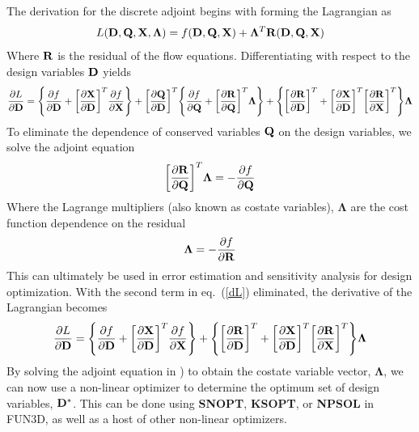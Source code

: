 The derivation for the discrete adjoint begins with forming the Lagrangian as
\begin{equation}
  L(\mathbf D,\mathbf Q,\mathbf X,\mathbf{\Lambda})=f(\mathbf D,\mathbf Q,\mathbf X)
  +\mathbf{\Lambda}^T\mathbf R(\mathbf D,\mathbf Q,\mathbf X)
\end{equation}
Where $\mathbf R$ is the residual of the flow equations.  Differentiating with respect
to the design variables $\mathbf D$ yields
\begin{equation}
  \frac{\partial L}{\partial \mathbf D} = 
  \Bigg\{\frac{\partial f}{\partial \mathbf D}+\bigg[\frac{\partial \mathbf X}{\partial \mathbf D}\bigg]^T \frac{\partial f}{\partial \mathbf X}\Bigg\} 
  + \bigg[\frac{\partial \mathbf Q}{\partial \mathbf D}\bigg]^T
  \Bigg\{\frac{\partial f}{\partial \mathbf Q}+\bigg[\frac{\partial \mathbf R}{\partial \mathbf Q}\bigg]^T \mathbf{\Lambda}\Bigg\}
  +\Bigg\{\bigg[\frac{\partial \mathbf R}{\partial \mathbf D}\bigg]^T
  +\bigg[\frac{\partial \mathbf X}{\partial \mathbf D}\bigg]^T\bigg[\frac{\partial \mathbf R}{\partial \mathbf X}\bigg]^T\Bigg\}\mathbf{\Lambda}
  \label{dL}
\end{equation}
To eliminate the dependence of conserved variables $\mathbf Q$ on the design
variables, we solve the adjoint equation
\begin{equation}
  \bigg[\frac{\partial \mathbf R}{\partial \mathbf Q}\bigg]^T\mathbf{\Lambda} = -\frac{\partial f}{\partial \mathbf Q}
  \label{adjoint-main}
\end{equation}
Where the Lagrange multipliers (also known as costate variables),
$\mathbf{\Lambda}$ are the cost function dependence on the residual
\begin{equation}
  \mathbf{\Lambda}=-\frac{\partial f}{\partial \mathbf R}
\end{equation}
This can ultimately be used in error estimation and sensitivity analysis for
design optimization.  With the second term in eq.~(\ref{dL}) eliminated, the
derivative of the Lagrangian becomes
\begin{equation}
  \frac{\partial L}{\partial \mathbf D}=
  \Bigg\{\frac{\partial f}{\partial \mathbf D}+\bigg[\frac{\partial \mathbf X}{\partial \mathbf D}\bigg]^T \frac{\partial f}{\partial \mathbf X}\Bigg\}
  +\Bigg\{\bigg[\frac{\partial \mathbf R}{\partial \mathbf D}\bigg]^T
  +\bigg[\frac{\partial \mathbf X}{\partial \mathbf D}\bigg]^T\bigg[\frac{\partial \mathbf R}{\partial \mathbf X}\bigg]^T\Bigg\}\mathbf{\Lambda}
  \label{obj-function}
\end{equation}
By solving the adjoint equation in ) to obtain the costate
variable vector, $\mathbf{\Lambda}$, we can now use a non-linear optimizer to
determine the optimum set of design variables, $\mathbf D^*$. This can be done using
{\bf SNOPT\cite{snopt-manual}}, {\bf KSOPT\cite{KSOPT}}, or {\bf
  NPSOL\cite{npsol-manual}} in FUN3D, as well as a host of other non-linear
  optimizers.

